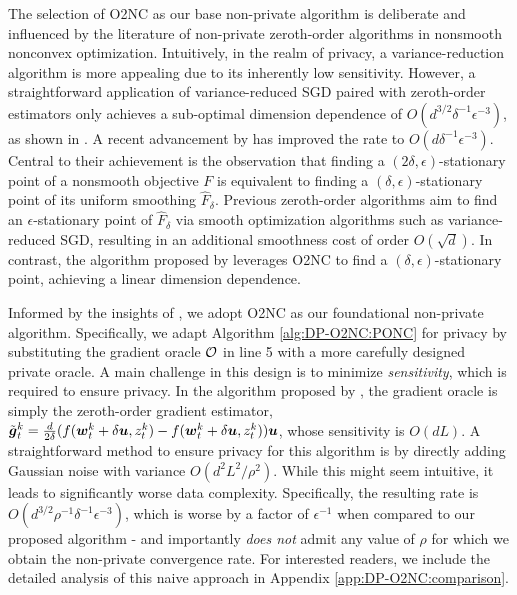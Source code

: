 The selection of O2NC as our base non-private algorithm is deliberate and influenced by the literature of non-private zeroth-order algorithms in nonsmooth nonconvex optimization. Intuitively, in the realm of privacy, a variance-reduction algorithm is more appealing due to its inherently low sensitivity. However, a straightforward application of variance-reduced SGD paired with zeroth-order estimators only achieves a sub-optimal dimension dependence of $O(d^{3/2}\delta^{-1}\epsilon^{-3})$, as shown in \citep{chen2023faster}. 
A recent advancement by \cite{kornowski2023algorithm} has improved the rate to $O(d\delta^{-1}\epsilon^{-3})$. Central to their achievement is the observation that finding a $(2\delta,\epsilon)$-stationary point of a nonsmooth objective $F$ is equivalent to finding a $(\delta,\epsilon)$-stationary point of its uniform smoothing $\hat F_\delta$. 
Previous zeroth-order algorithms aim to find an $\epsilon$-stationary point of $\hat F_\delta$ via smooth optimization algorithms such as variance-reduced SGD, resulting in an additional smoothness cost of order $O(\sqrt{d})$. In contrast, the algorithm proposed by \cite{kornowski2023algorithm} leverages O2NC to find a $(\delta,\epsilon)$-stationary point, achieving a linear dimension dependence. 

Informed by the insights of \citep{kornowski2023algorithm}, we adopt O2NC as our foundational non-private algorithm. Specifically, we adapt Algorithm \ref{alg:DP-O2NC:PONC} for privacy by substituting the gradient oracle ${\cal O}$ in line 5 with a more carefully designed private oracle. A main challenge in this design is to minimize \emph{sensitivity}, which is required to ensure privacy. In the algorithm proposed by \cite{kornowski2023algorithm}, the gradient oracle is simply the zeroth-order gradient estimator, $\tilde{{\boldsymbol{g}}}_t^k = \frac{d}{2\delta}(f({\boldsymbol{w}}_t^k+\delta{\boldsymbol{u}}, z_t^k) - f({\boldsymbol{w}}_t^k+\delta{\boldsymbol{u}}, z_t^k)){\boldsymbol{u}}$, whose sensitivity is $O(dL)$. 
A straightforward method to ensure privacy for this algorithm is by directly adding Gaussian noise with variance $O(d^2L^2/\rho^2)$. While this might seem intuitive, it leads to significantly worse data complexity. Specifically, the resulting rate is $O(d^{3/2}\rho^{-1}\delta^{-1}\epsilon^{-3})$, which is worse by a factor of $\epsilon^{-1}$ when compared to our proposed algorithm - and importantly \emph{does not} admit any value of $\rho$ for which we obtain the non-private convergence rate. For interested readers, we include the detailed analysis of this naive approach in Appendix \ref{app:DP-O2NC:comparison}.


